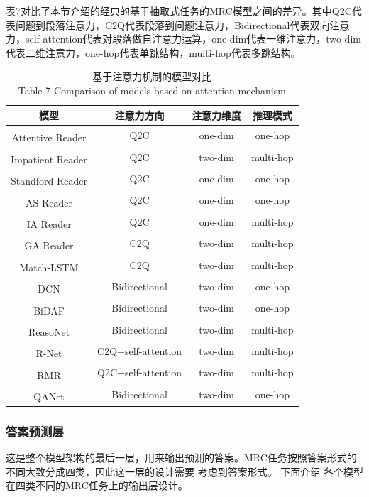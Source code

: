 \documentclass{article}
\newcommand{\upcite}[1]{\textsuperscript{\textsuperscript{\cite{#1}}}}
\begin{document}
表7对比了本节介绍的经典的基于抽取式任务的MRC模型之间的差异。其中Q2C代表问题到段落注意力，C2Q代表段落到问题注意力，Bidirectional代表双向注意力，self-attention代表对段落做自注意力运算，one-dim代表一维注意力，two-dim代表二维注意力，one-hop代表单跳结构，multi-hop代表多跳结构。
\begin{table}[ht]
	\centering
	\caption{基于注意力机制的模型对比 \\ Table 7 Comparison of models based on attention mechanism}
	\begin{tabular}{c c c c}
		\toprule
		模型&注意力方向&注意力维度&推理模式 \\
		\midrule
		Attentive Reader\upcite{Hermann}&Q2C&one-dim&one-hop \\
		\midrule
		Impatient Reader\upcite{Hermann}&Q2C&two-dim&multi-hop \\
		\midrule
		Standford Reader\upcite{AR}&Q2C&one-dim&one-hop \\
		\midrule
		AS Reader\upcite{ASR}&Q2C&one-dim&one-hop \\
		\midrule
		IA Reader\upcite{IAReader}&Q2C&one-dim&multi-hop \\
		\midrule
		GA Reader\upcite{GAReader}&C2Q&two-dim&multi-hop \\
		\midrule
		Match-LSTM\upcite{MatchLSTM}&C2Q&two-dim&multi-hop \\
		\midrule
		DCN\upcite{DCN}&Bidirectional&two-dim&one-hop \\           
		\midrule
		BiDAF\upcite{BiDAF}&Bidirectional&two-dim&one-hop \\
		\midrule
		ReasoNet\upcite{Reasonet}&Bidirectional&two-dim&multi-hop\\
		\midrule
		R-Net\upcite{RNet}&C2Q+self-attention&two-dim&multi-hop \\
		\midrule
		RMR\upcite{RMR}&Q2C+self-attention&two-dim&multi-hop \\
		\midrule
		QANet\upcite{QANet}&Bidirectional&two-dim&one-hop\\
		\bottomrule
	\end{tabular}
\end{table}



\subsubsection{答案预测层}
这是整个模型架构的最后一层，用来输出预测的答案。MRC任务按照答案形式的不同大致分成四类，因此这一层的设计需要
考虑到答案形式。
%
下面介绍
各个模型在四类不同的MRC任务上的输出层设计。
\end{document}
